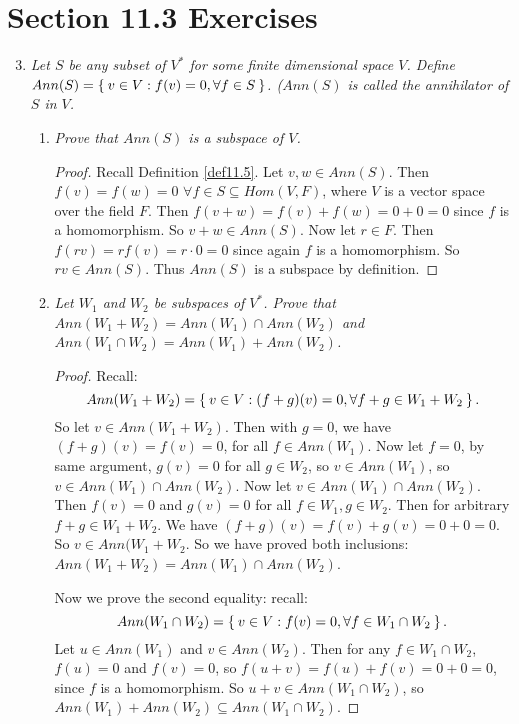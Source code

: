 \documentclass[10pt,oneside,reqno]{amsart}
\theoremstyle{plain}
\theoremstyle{definition}
\theoremstyle{remark}
\newcommand{\sub}{\subseteq}
\begin{document}
\section*{Section 11.3 Exercises}
\begin{enumerate}[label=\arabic*.]
\setcounter{enumi}{2}

\item \textit{Let $S$ be any subset of $V^*$ for some finite dimensional space $V$. Define $Ann(S) = \Set{v \in V:f(v) = 0,\forall f \in S}$. ($Ann(S)$ is called the annihilator of $S$ in $V$. }

\begin{enumerate}
\item \textit{Prove that $Ann(S)$ is a subspace of $V$. }

\begin{proof}
Recall Definition \ref{def11.5}. Let $v,w \in Ann(S)$. Then $f(v) = f(w) = 0$ $\forall f \in S \sub Hom(V,F)$, where $V$ is a vector space over the field $F$. Then $f(v + w) = f(v) + f(w) = 0 + 0 = 0$ since $f$ is a homomorphism. So $v + w \in Ann(S)$. Now let $r \in F$. Then $f(rv) = rf(v) = r\cdot 0 = 0$ since again $f$ is a homomorphism. So $rv \in Ann(S)$. Thus $Ann(S)$ is a subspace by definition. 
\end{proof}



\item \textit{Let $W_1$ and $W_2$ be subspaces of $V^*$. Prove that $Ann(W_1 + W_2) = Ann(W_1) \cap Ann(W_2)$ and $Ann(W_1 \cap W_2) = Ann(W_1) + Ann(W_2)$. }

\begin{proof}
Recall: 
$$
Ann(W_1 + W_2) = \Set{v \in V:(f + g)(v)  =0,\forall f + g \in W_1 + W_2}.
$$
So let $v \in Ann(W_1 + W_2)$. Then with $g = 0$, we have $(f + g)(v) = f(v) = 0$, for all $f \in Ann(W_1)$. Now let $f = 0$, by same argument, $g(v) = 0$ for all $g \in W_2$, so $v \in Ann(W_1)$, so $v \in Ann(W_1) \cap Ann(W_2)$. Now let $v \in Ann(W_1) \cap Ann(W_2)$. Then $f(v) = 0$ and $g(v) = 0$ for all $f \in W_1,g \in W_2$. Then for arbitrary $f + g \in W_1 + W_2$. We have $(f + g)(v) = f(v) + g(v) = 0 + 0 = 0$. So $v \in Ann(W_1 + W_2$. So we have proved both inclusions: $Ann(W_1 + W_2) = Ann(W_1) \cap Ann(W_2)$. 

Now we prove the second equality: recall:
$$
Ann(W_1 \cap W_2) = \Set{v \in V: f(v) = 0,\forall f \in W_1\cap W_2}.
$$
Let $u \in Ann(W_1)$ and $v \in Ann(W_2)$. Then for any $f \in W_1 \cap W_2$, $f(u) = 0$ and $f(v) = 0$, so $f(u + v) = f(u) + f(v) = 0 + 0 = 0$, since $f$ is a homomorphism. So $u + v \in Ann(W_1 \cap W_2)$, so $Ann(W_1) + Ann(W_2) \sub Ann(W_1 \cap W_2)$. 


\end{proof}
\end{enumerate}
\end{enumerate}
\end{document}
